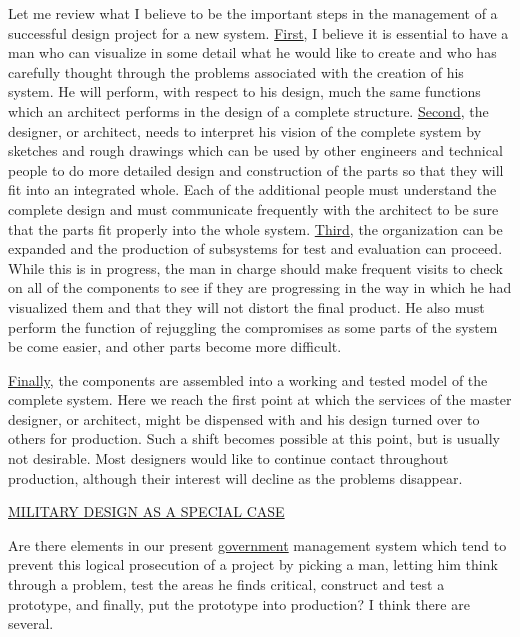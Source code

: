\documentclass{memoir}
\begin{document}
Let me review what I believe to be the important steps in the management of a successful design project for a new system. \underline{First}, I believe it is essential to have a man who can visualize in some detail what he would like to create and who has carefully thought through the problems associated with the creation of his system. He will perform, with respect to his design, much the same functions which an architect performs in the design of a complete structure. \underline{Second}, the designer, or architect, needs to interpret his vision of the complete system by sketches and rough drawings which can be used by other engineers and technical people to do more detailed design and construction of the parts so that they will fit into an integrated whole. Each of the additional people must understand the complete design and must communicate frequently with the architect to be sure that the parts fit properly into the whole system. \underline{Third}, the organization can be expanded and the production of subsystems for test and evaluation can proceed. While this is in progress, the man in charge should make frequent visits to check on all of the components to see if they are progressing in the way in which he had visualized them and that they will not distort the final product. He also must perform the function of rejuggling the compromises as some parts of the system be come easier, and other parts become more difficult.

\underline{Finally}, the components are assembled into a working and tested model of the complete system. Here we reach the first point at which the services of the master designer, or architect, might be dispensed with and his design turned over to others for production. Such a shift becomes possible at this point, but is usually not desirable. Most designers would like to continue contact throughout production, although their interest will decline as the problems disappear.

\underline{MILITARY DESIGN AS A SPECIAL CASE}

Are there elements in our present \underline{government} management system which tend to prevent this logical prosecution of a project by picking a man, letting him think through a problem, test the areas he finds critical, construct and test a prototype, and finally, put the prototype into production? I think there are several.
\end{document}
